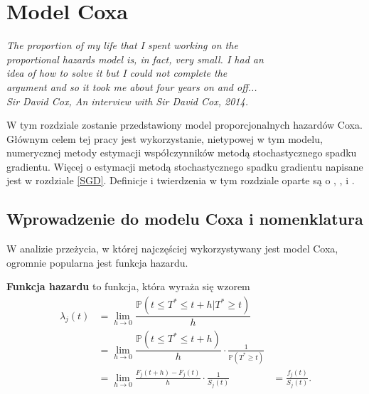 \chapter{Model Coxa}
\begin{flushright}
\textit{The proportion of my life that I spent working on the \\ 
proportional hazards model is, in fact, very small. I had an \\
 idea of how to solve it but I could not complete the \\
  argument and so it took me about four years on and off... \\
Sir David Cox, An interview with Sir David Cox, 2014.
}
\end{flushright}


W tym rozdziale zostanie przedstawiony model proporcjonalnych hazardów Coxa. Głównym celem tej pracy jest wykorzystanie, nietypowej w tym modelu, numerycznej metody estymacji współczynników metodą stochastycznego spadku gradientu. Więcej o estymacji metodą stochastycznego spadku gradientu napisane jest w rozdziale \ref{SGD}. Definicje i twierdzenia w tym rozdziale oparte są o \cite{cox}, \cite{ther}, \cite{assel} i \cite{burzyk1}.



\section{Wprowadzenie do modelu Coxa i nomenklatura}

W analizie przeżycia, w której najczęściej wykorzystywany jest model Coxa, ogromnie popularna jest funkcja hazardu.
\begin{definition}
\textbf{Funkcja hazardu} to funkcja, która wyraża się wzorem
\begin{equation}
\begin{align*}
\lambda_j(t) & =  \lim\limits_{h\rightarrow 0}\dfrac{\mathbb{P}(t \leq T^* \leq t +h | T^* \geq t)}{h} & \ \\
 \ & = \lim\limits_{h\rightarrow 0}\dfrac{\mathbb{P}(t \leq T^* \leq t +h )}{h}\cdot\frac{1}{  \mathbb{P}(T^* \geq t)} & \ \\ \ & = \lim\limits_{h\rightarrow 0} \frac{F_j(t+h) - F_j(t) }{h}\cdot\frac{1}{S_j(t)} & =  \frac{f_j(t)}{S_j(t)}.
\end{align*}
\end{equation}
\end{definition}

